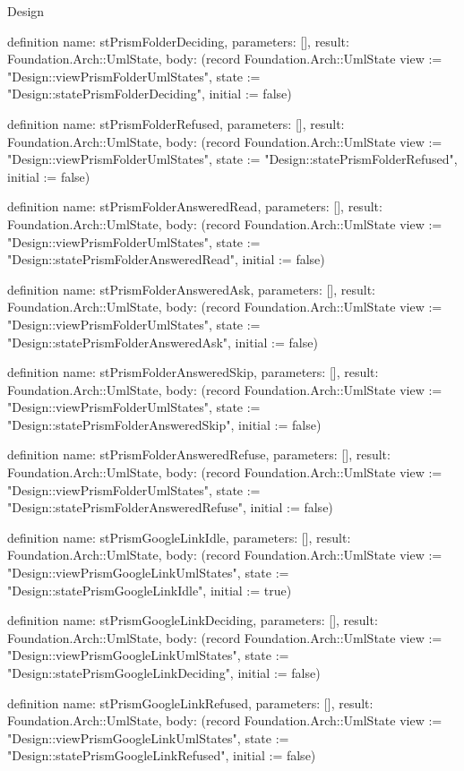 \begin{lexlean}{Design}
\begin{semanticmodule}
definition{
  name: stPrismFolderDeciding,
  parameters: [],
  result: Foundation.Arch::UmlState,
  body: (record Foundation.Arch::UmlState {view := "Design::viewPrismFolderUmlStates", state := "Design::statePrismFolderDeciding", initial := false})
}

definition{
  name: stPrismFolderRefused,
  parameters: [],
  result: Foundation.Arch::UmlState,
  body: (record Foundation.Arch::UmlState {view := "Design::viewPrismFolderUmlStates", state := "Design::statePrismFolderRefused", initial := false})
}

definition{
  name: stPrismFolderAnsweredRead,
  parameters: [],
  result: Foundation.Arch::UmlState,
  body: (record Foundation.Arch::UmlState {view := "Design::viewPrismFolderUmlStates", state := "Design::statePrismFolderAnsweredRead", initial := false})
}

definition{
  name: stPrismFolderAnsweredAsk,
  parameters: [],
  result: Foundation.Arch::UmlState,
  body: (record Foundation.Arch::UmlState {view := "Design::viewPrismFolderUmlStates", state := "Design::statePrismFolderAnsweredAsk", initial := false})
}

definition{
  name: stPrismFolderAnsweredSkip,
  parameters: [],
  result: Foundation.Arch::UmlState,
  body: (record Foundation.Arch::UmlState {view := "Design::viewPrismFolderUmlStates", state := "Design::statePrismFolderAnsweredSkip", initial := false})
}

definition{
  name: stPrismFolderAnsweredRefuse,
  parameters: [],
  result: Foundation.Arch::UmlState,
  body: (record Foundation.Arch::UmlState {view := "Design::viewPrismFolderUmlStates", state := "Design::statePrismFolderAnsweredRefuse", initial := false})
}

definition{
  name: stPrismGoogleLinkIdle,
  parameters: [],
  result: Foundation.Arch::UmlState,
  body: (record Foundation.Arch::UmlState {view := "Design::viewPrismGoogleLinkUmlStates", state := "Design::statePrismGoogleLinkIdle", initial := true})
}

definition{
  name: stPrismGoogleLinkDeciding,
  parameters: [],
  result: Foundation.Arch::UmlState,
  body: (record Foundation.Arch::UmlState {view := "Design::viewPrismGoogleLinkUmlStates", state := "Design::statePrismGoogleLinkDeciding", initial := false})
}

definition{
  name: stPrismGoogleLinkRefused,
  parameters: [],
  result: Foundation.Arch::UmlState,
  body: (record Foundation.Arch::UmlState {view := "Design::viewPrismGoogleLinkUmlStates", state := "Design::statePrismGoogleLinkRefused", initial := false})
}


\end{semanticmodule}
\end{lexlean}
